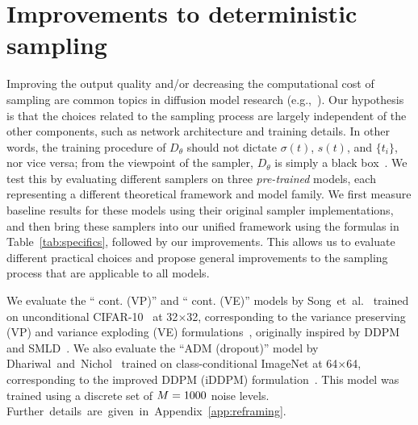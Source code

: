 \documentclass{article}
\begin{document}
\vspace*{-1mm}
\section{Improvements to deterministic sampling}
\vspace*{-.5mm}
\label{sec:deterministic}

{Improving the output quality and/or decreasing the computational cost of sampling are common topics in diffusion model research (e.g.,~\cite{Dockhorn2022damped,Jolicoeur2021,Liu2022pseudo,Lu2022dpm,Luhman2021speed,Nichol2021a,Salimans2022,Vahdat2021,Watson2022fastsample,Watson2021efficientsample,Zhang2022exp}).}
Our hypothesis is that the choices related to the sampling process are largely independent of the other components, such as network architecture and training details.
In other words, the training procedure of $D_\theta$ should not dictate $\sigma(t)$, $s(t)$, and $\{t_i\}$, nor vice versa; from the viewpoint of the sampler, $D_\theta$ is simply a black box~\cite{Watson2022fastsample,Watson2021efficientsample}.
We test this by evaluating different samplers on three \emph{pre-trained} models, each representing a different theoretical framework and model family.
We first measure baseline results for these models using their original sampler implementations, and then bring these samplers into our unified framework using the formulas in Table~\ref{tab:specifics}, followed by our improvements.
{This allows us to evaluate different practical choices and propose general improvements to the sampling process that are applicable to all models.}

We evaluate the ``\ddpmpp{} cont. (VP)'' and ``\ncsnpp{} cont. (VE)'' models by Song~et~al.~\cite{Song2021sde} trained on unconditional CIFAR-10~\cite{Krizhevsky2009cifar} at 32$\times$32, corresponding to the variance preserving (VP) and variance exploding (VE) formulations~\cite{Song2021sde}, originally inspired by DDPM~\cite{Ho2020} and SMLD~\cite{Song2019gradients}.
We also evaluate the ``ADM (dropout)'' model by Dhariwal~and~Nichol~\cite{Dhariwal2021} trained on class-conditional ImageNet \cite{Deng2009imagenet} at 64$\times$64, corresponding to the improved DDPM (iDDPM) formulation~\cite{Nichol2021a}.
This model was trained using a {discrete} set of $M=1000$ noise levels.
\mbox{Further details are given in Appendix~\ref{app:reframing}.} %


\figOdePlotNfe
\end{document}
